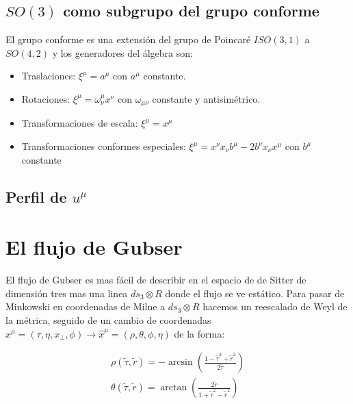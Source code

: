 \documentclass[11pt,a4paper]{article}
\begin{document}
\subsection{$SO(3)$ como subgrupo del grupo conforme}

El grupo conforme es una extensión del grupo de Poincaré $ISO(3,1)$ a $SO(4,2)$ y los generadores del álgebra son:

\begin{itemize}
\item  Traslaciones: $\xi^{\mu}=a^{\mu}$ con $a^{\mu}$ constante.
\end{itemize}

\begin{itemize}
\item  Rotaciones: $\xi^{\mu}=\omega^{\mu}_{\nu}x^{\nu}$ con $\omega_{{\mu}{\nu}}$ constante y antisimétrico.
\end{itemize}

\begin{itemize}
\item  Transformaciones de escala: $\xi^{\mu}=x^{\mu}$
\end{itemize}

\begin{itemize}
\item  Transformaciones conformes especiales: $\xi^{\mu}=x^{\nu}x_{\nu}b^{\mu}-2b^{\nu}x_{\nu}x^{\mu}$ con $b^{\mu}$ constante
\end{itemize}

\subsection{Perfil de $u^{\mu}$}


\section{El flujo de Gubser}

El flujo de Gubser es mas fácil de describir en el espacio de de Sitter de dimensión tres mas una linea $ds_{3}{\otimes}R$ donde el flujo se ve estático. Para pasar de Minkowski en coordenadas de Milne a $ds_{3}{\otimes}R$ hacemos un reescalado de Weyl de la métrica, seguido de un cambio de coordenadas $x^{\mu}=(\tau,\eta,x_{\bot},\phi)\rightarrow{\hat{x}^{\mu}}=(\rho,\theta,\phi,\eta)$ de la forma:


\begin{subequations}
\begin{align}
\rho(\tilde{\tau},\tilde{r})=-\arcsin(\frac{1-{\tilde{\tau}}^2+{\tilde{r}}^2}{2\tilde{\tau}})\\
\theta(\tilde{\tau},\tilde{r})=\arctan(\frac{2\tilde{r}}{1+{\tilde{\tau}}^2-{\tilde{r}}^2})
\end{align}
\label{cambio_de_coordenadas}
\end{subequations}
\end{document}
